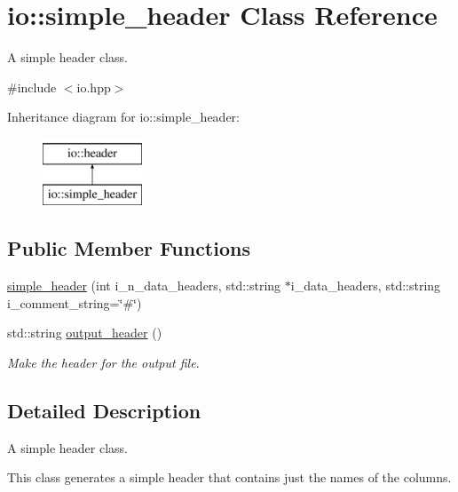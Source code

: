 \hypertarget{classio_1_1simple__header}{\section{io\-:\-:simple\-\_\-header Class Reference}
\label{classio_1_1simple__header}
}


A simple header class.  




{\ttfamily \#include $<$io.\-hpp$>$}

Inheritance diagram for io\-:\-:simple\-\_\-header\-:\begin{figure}[H]
\begin{center}
\leavevmode
\includegraphics[height=2.000000cm]{classio_1_1simple__header}
\end{center}
\end{figure}
\subsection*{Public Member Functions}
\begin{DoxyCompactItemize}
\item 
\hyperlink{classio_1_1simple__header_acc91be33c4fc1456e670d30a64a1ec72}{simple\-\_\-header} (int i\-\_\-n\-\_\-data\-\_\-headers, std\-::string $\ast$i\-\_\-data\-\_\-headers, std\-::string i\-\_\-comment\-\_\-string=\char`\"{}\#\char`\"{})
\item 
std\-::string \hyperlink{classio_1_1simple__header_a24e9f310d5a022872ef315204e4b0add}{output\-\_\-header} ()
\begin{DoxyCompactList}\small\item\em Make the header for the output file. \end{DoxyCompactList}\end{DoxyCompactItemize}


\subsection{Detailed Description}
A simple header class. 



 This class generates a simple header that contains just the names of the columns. 

